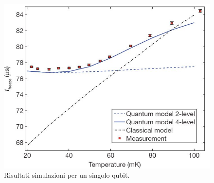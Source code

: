 \begin{figure}[htbp]
\centering
\includegraphics[scale=0.4]{Immagini/qa-qubit.jpg}
\caption{Risultati simulazioni per un singolo qubit.}
\label{figura:qa-qubit}
\end{figure}

